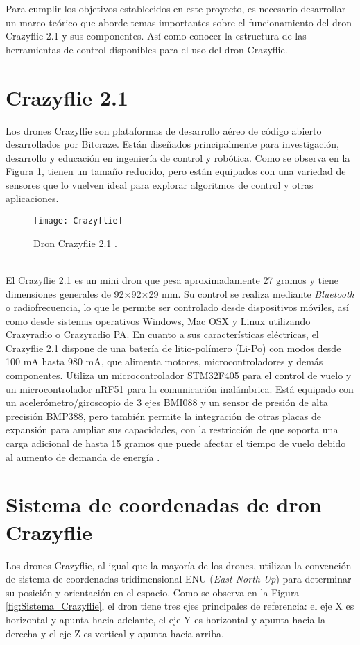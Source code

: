 Para cumplir los objetivos establecidos en este proyecto, es necesario desarrollar un marco teórico que aborde temas importantes sobre el funcionamiento del dron Crazyflie 2.1 y sus componentes. Así como conocer la estructura de las herramientas de control disponibles para el uso del dron Crazyflie.


\section{Crazyflie 2.1 }
Los drones Crazyflie son plataformas de desarrollo aéreo de código abierto desarrollados por Bitcraze. Están diseñados principalmente para investigación, desarrollo y educación en ingeniería de control y robótica. Como se observa en la Figura \ref{fig:Crazyflie}, tienen un tamaño reducido, pero están equipados con una variedad de sensores que lo vuelven ideal para explorar algoritmos de control y otras aplicaciones. 
\begin{figure}[htbp]
	\centering
	\texttt{[image: Crazyflie]}
	\caption{Dron Crazyflie 2.1 \cite{Crazyflie}.}
	\label{fig:Crazyflie}
\end{figure}
\\El Crazyflie 2.1 es un mini dron que pesa aproximadamente 27 gramos y tiene dimensiones generales de 92$\times$92$\times$29 mm. Su control se realiza mediante \textit{Bluetooth} o radiofrecuencia, lo que le permite ser controlado desde dispositivos móviles, así como desde sistemas operativos Windows, Mac OSX y Linux utilizando Crazyradio o Crazyradio PA. En cuanto a sus características eléctricas, el Crazyflie 2.1 dispone de una batería de litio-polímero (Li-Po) con modos desde 100 mA hasta 980 mA, que alimenta motores, microcontroladores y demás componentes. Utiliza un microcontrolador STM32F405 para el control de vuelo y un microcontrolador nRF51 para la comunicación inalámbrica. Está equipado con un acelerómetro/giroscopio de 3 ejes BMI088 y un sensor de presión de alta precisión BMP388, pero también permite la integración de otras placas de expansión para ampliar sus capacidades, con la restricción de que soporta una carga adicional de hasta 15 gramos que puede afectar el tiempo de vuelo debido al aumento de demanda de energía \cite{Crazyflie}. 

\section{Sistema de coordenadas de dron Crazyflie}
Los drones Crazyflie, al igual que la mayoría de los drones, utilizan la convención de sistema de coordenadas tridimensional ENU (\textit{East North Up}) para determinar su posición y orientación en el espacio. Como se observa en la Figura \ref{fig:Sistema_Crazyflie}, el dron tiene tres ejes principales de referencia: el eje X es horizontal y apunta hacia adelante, el eje Y es horizontal y apunta hacia la derecha y el eje Z es vertical y apunta hacia arriba. 

